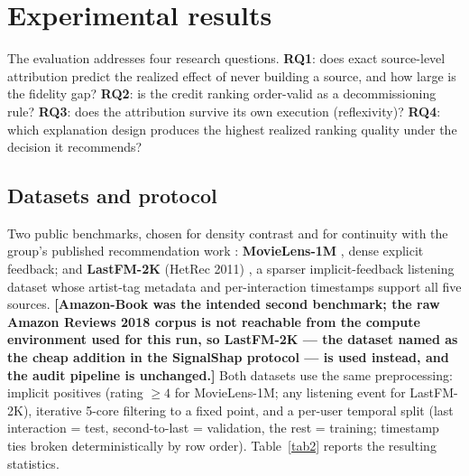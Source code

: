 \documentclass[pdflatex,sn-mathphys-num]{sn-jnl}
\theoremstyle{thmstyleone}%
\theoremstyle{thmstyletwo}%
\theoremstyle{thmstylethree}%
\newcommand{\tbd}[1]{\textbf{[#1]}}
\begin{document}
\section{Experimental results}\label{sec4}

The evaluation addresses four research questions. \textbf{RQ1}: does exact source-level attribution predict the realized effect of never building a source, and how large is the fidelity gap? \textbf{RQ2}: is the credit ranking order-valid as a decommissioning rule? \textbf{RQ3}: does the attribution survive its own execution (reflexivity)? \textbf{RQ4}: which explanation design produces the highest realized ranking quality under the decision it recommends?

\subsection{Datasets and protocol}\label{subsec4_1}

Two public benchmarks, chosen for density contrast and for continuity with the group's published recommendation work \cite{louhichi2026}: \textbf{MovieLens-1M} \cite{harper2015}, dense explicit feedback; and \textbf{LastFM-2K} (HetRec 2011) \cite{lastfm2011}, a sparser implicit-feedback listening dataset whose artist-tag metadata and per-interaction timestamps support all five sources. \tbd{Amazon-Book was the intended second benchmark; the raw Amazon Reviews 2018 corpus is not reachable from the compute environment used for this run, so LastFM-2K --- the dataset named as the cheap addition in the SignalShap protocol \cite{louhichi2026signalshap} --- is used instead, and the audit pipeline is unchanged.} Both datasets use the same preprocessing: implicit positives (rating $\ge 4$ for MovieLens-1M; any listening event for LastFM-2K), iterative 5-core filtering to a fixed point, and a per-user temporal split (last interaction = test, second-to-last = validation, the rest = training; timestamp ties broken deterministically by row order). Table~\ref{tab2} reports the resulting statistics.
\end{document}
